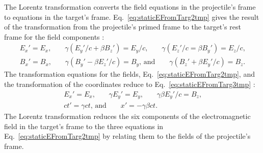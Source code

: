     The Lorentz transformation converts the field equations in the 
      projectile's frame to equations in the target's frame.
    Eq.~\ref{eq:staticEFromTarg2tmp} gives the result of the transformation 
      from the projectile's primed frame to the target's rest frame for 
      the field components \cite{WWJackson}:
    \begin{eqnarray} \label{eq:staticEFromTarg2tmp}
        E_{x}'=E_{x}\textrm{,}\qquad
        \gamma\left(E_{y}'/c+\beta B_{z}'\right)=E_{y}/c\textrm{,}\qquad
        \gamma\left(E_{z}'/c=\beta B_{y}'\right)=E_{z}/c\textrm{,} \nonumber \\
        B_{x}'=B_{x}\textrm{,}\qquad
        \gamma\left(B_{y}'-\beta E_{z}'/c\right)=B_{y}\textrm{, and}\qquad
        \gamma\left(B_{z}'+\beta E_{y}'/c\right)=B_{z}\textrm{.}
    \end{eqnarray}
    The transformation equations for the fields, 
      Eq.~\ref{eq:staticEFromTarg2tmp}, and the transformation of the 
      coordinates reduce to Eq.~\ref{eq:staticEFromTarg3tmp} \cite{WWJackson}:
    \begin{eqnarray} \label{eq:staticEFromTarg3tmp}
        E_{x}'=E_{x}\textrm{,}\qquad
        \gamma E_{y}'=E_{y}\textrm{,}\qquad
        \gamma \beta E_{y}'/c=B_{z}\textrm{,}\nonumber \\
        ct'=\gamma ct\textrm{, and}\qquad
        x'=-\gamma \beta c t\textrm{.}
    \end{eqnarray}
    The Lorentz transformation reduces the six components of the 
      electromagnetic field in the target's frame to the three equations in 
      Eq.~\ref{eq:staticEFromTarg2tmp} by relating them to the fields of the 
      projectile's frame. 
    
